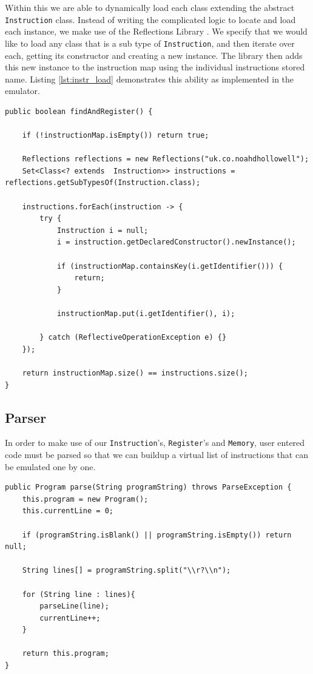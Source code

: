 Within this we are able to dynamically load each class extending the abstract \texttt{Instruction} class. Instead of writing the complicated logic to locate and load each instance, we make use of the Reflections Library \cite{ronmamo_2022_ronmamoreflections}. We specify that we would like to load any class that is a sub type of \texttt{Instruction}, and then iterate over each, getting its constructor and creating a new instance. The library then adds this new instance to the instruction map using the individual instructions stored name. Listing \ref{lst:instr_load} demonstrates this ability as implemented in the emulator.

\begin{lstlisting}[caption=Instruction loading using Reflections \cite{ronmamo_2022_ronmamoreflections} durign runtime, label=lst:instr_load]
public boolean findAndRegister() {

    if (!instructionMap.isEmpty()) return true;

    Reflections reflections = new Reflections("uk.co.noahdhollowell");
    Set<Class<? extends  Instruction>> instructions = reflections.getSubTypesOf(Instruction.class);

    instructions.forEach(instruction -> {
        try {
            Instruction i = null;
            i = instruction.getDeclaredConstructor().newInstance();

            if (instructionMap.containsKey(i.getIdentifier())) {
                return;
            }

            instructionMap.put(i.getIdentifier(), i);

        } catch (ReflectiveOperationException e) {}
    });

    return instructionMap.size() == instructions.size();
}
\end{lstlisting}

\subsection{Parser}\label{sec:impl_parser}
In order to make use of our \texttt{Instruction}'s, \texttt{Register}'s and \texttt{Memory}, user entered code must be parsed so that we can buildup a virtual list of instructions that can be emulated one by one.

\begin{lstlisting}[caption=Starting parse method, label=lst:parse_start]
 public Program parse(String programString) throws ParseException {
    this.program = new Program();
    this.currentLine = 0;

    if (programString.isBlank() || programString.isEmpty()) return null;

    String lines[] = programString.split("\\r?\\n");

    for (String line : lines){
        parseLine(line);
        currentLine++;
    }

    return this.program;
}
\end{lstlisting}

